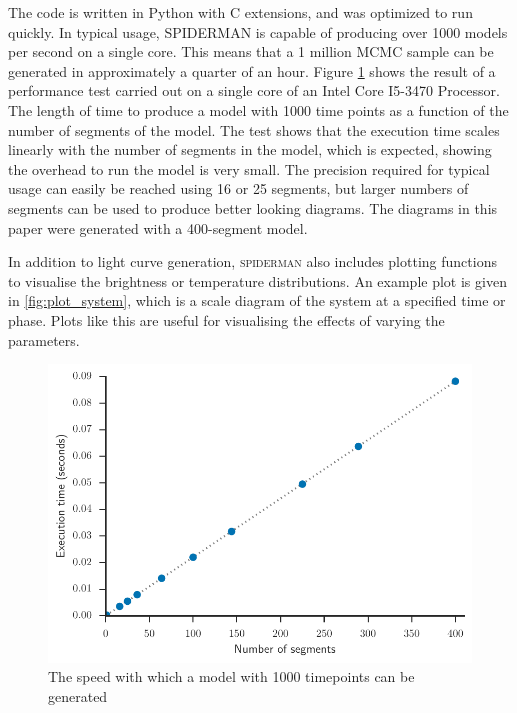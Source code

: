 \documentclass[a4paper,fleqn,usenatbib]{mnras}
\begin{document}
The code is written in Python with C extensions, and was optimized to run quickly. In typical usage, SPIDERMAN is capable of producing over 1000 models per second on a single core. This means that a 1 million MCMC sample can be generated in approximately a quarter of an hour. Figure \ref{fig:exec_time} shows the result of a performance test carried out on a single core of an Intel Core I5-3470 Processor. The length of time to produce a model with 1000 time points as a function of the number of segments of the model. The test shows that the execution time scales linearly with the number of segments in the model, which is expected, showing the overhead to run the model is very small. The precision required for typical usage can easily be reached using 16 or 25 segments, but larger numbers of segments can be used to produce better looking diagrams. The diagrams in this paper were generated with a 400-segment model.

In addition to light curve generation, \textsc{spiderman} also includes plotting functions to visualise the brightness or temperature distributions. An example plot is given in \ref{fig:plot_system}, which is a scale diagram of the system at a specified time or phase. Plots like this are useful for visualising the effects of varying the parameters.

\begin{figure}
\begin{center}
\includegraphics[width=\columnwidth]{img/exec_time.pdf}
\caption{The speed with which a model with 1000 timepoints can be generated}
\label{fig:exec_time}
\end{center}
\end{figure}
\end{document}
